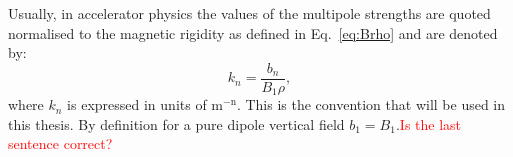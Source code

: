
Usually, in accelerator physics the values of the multipole strengths are quoted normalised to the magnetic rigidity as defined in Eq.~\eqref{eq:Brho} and are denoted by:
\begin{equation}\label{eq:kn}
    k_n = \frac{b_n}{B_1 \rho},
\end{equation}
where $k_n$ is expressed in units of  $\mathrm{m^{-n}}$. This is the convention that will be used in this thesis. %
By definition for a pure dipole vertical field $b_1=B_1$.\textcolor{red}{Is the last sentence correct?}


